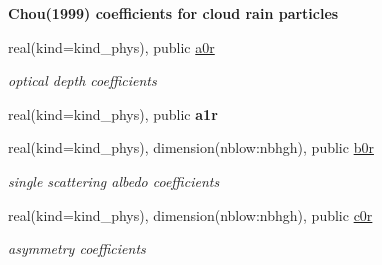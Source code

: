 \begin{Indent}\textbf{ Chou(1999) coefficients for cloud rain particles}\par
\begin{DoxyCompactItemize}
\item 
\mbox{\label{namespacemodule__radsw__cldprtb_a0fdb9425031a10735e11d7f5c9e0376e}} 
real(kind=kind\+\_\+phys), public \hyperlink{namespacemodule__radsw__cldprtb_a0fdb9425031a10735e11d7f5c9e0376e}{a0r}
\begin{DoxyCompactList}\small\item\em optical depth coefficients \end{DoxyCompactList}\item 
\mbox{\label{namespacemodule__radsw__cldprtb_a9826a0616c434620200ce4652b5af800}} 
real(kind=kind\+\_\+phys), public {\bfseries a1r}
\item 
\mbox{\label{namespacemodule__radsw__cldprtb_ac39d49e73ffa960421e36e45a35db162}} 
real(kind=kind\+\_\+phys), dimension(nblow\+:nbhgh), public \hyperlink{namespacemodule__radsw__cldprtb_ac39d49e73ffa960421e36e45a35db162}{b0r}
\begin{DoxyCompactList}\small\item\em single scattering albedo coefficients \end{DoxyCompactList}\item 
\mbox{\label{namespacemodule__radsw__cldprtb_a8927b6e7cc810301e3843eb0f5c0c795}} 
real(kind=kind\+\_\+phys), dimension(nblow\+:nbhgh), public \hyperlink{namespacemodule__radsw__cldprtb_a8927b6e7cc810301e3843eb0f5c0c795}{c0r}
\begin{DoxyCompactList}\small\item\em asymmetry coefficients \end{DoxyCompactList}\end{DoxyCompactItemize}
\end{Indent}



